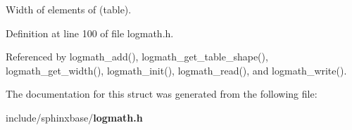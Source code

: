 Width of elements of (table). 



Definition at line 100 of file logmath.\-h.



Referenced by logmath\-\_\-add(), logmath\-\_\-get\-\_\-table\-\_\-shape(), logmath\-\_\-get\-\_\-width(), logmath\-\_\-init(), logmath\-\_\-read(), and logmath\-\_\-write().



The documentation for this struct was generated from the following file\-:\begin{DoxyCompactItemize}
\item 
include/sphinxbase/{\bf logmath.\-h}\end{DoxyCompactItemize}
